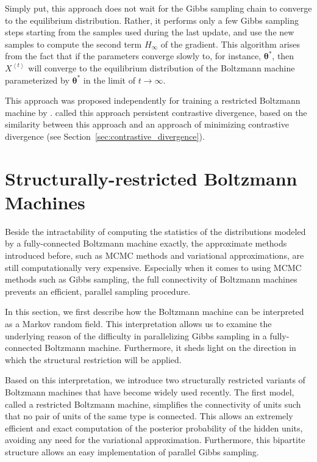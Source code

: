 \documentclass{now}
\newcommand{\qt}[1]{\left<#1\right>}
\newcommand{\vects}[1]{\boldsymbol{#1}}
\newcommand{\TT}[0]{{\vects{\theta}}}
\begin{document}
Simply put, this approach does not wait for the Gibbs sampling chain to converge
to the equilibrium distribution.  Rather, it performs only a few Gibbs sampling
steps starting from the samples used during the last update, and use the new
samples to compute the second term $H_\infty$ of the gradient. This algorithm
arises from the fact that if the parameters converge slowly to, for instance,
$\TT^*$, then $X^{\qt{t}}$ will converge to the equilibrium distribution of the
Boltzmann machine parameterized by $\TT^*$ in the limit of $t \to \infty$.

This approach was proposed independently for training a restricted Boltzmann
machine by \citet{Tieleman2008}.  \citet{Tieleman2008} called this approach
persistent contrastive divergence, based on the similarity between this approach
and an approach of minimizing contrastive divergence (see
Section~\ref{sec:contrastive_divergence}).




\section{Structurally-restricted Boltzmann Machines}
\label{sec:srbm}

Beside the intractability of computing the statistics of the distributions
modeled by a fully-connected Boltzmann machine exactly, the approximate methods
introduced before, such as MCMC methods and variational approximations, are
still computationally very expensive. Especially when it comes to using MCMC
methods such as Gibbs sampling, the full connectivity of Boltzmann machines
prevents an efficient, parallel sampling procedure.

In this section, we first describe how the Boltzmann machine can be interpreted
as a Markov random field. This interpretation allows us to examine the
underlying reason of the difficulty in parallelizing Gibbs sampling in a
fully-connected Boltzmann machine. Furthermore, it sheds light on the direction
in which the structural restriction will be applied.

Based on this interpretation, we introduce two structurally restricted variants
of Boltzmann machines that have become widely used recently. The first model,
called a restricted Boltzmann machine, simplifies the connectivity of units such
that no pair of units of the same type is connected. This allows an extremely
efficient and exact computation of the posterior probability of the hidden
units, avoiding any need for the variational approximation. Furthermore, this
bipartite structure allows an easy implementation of parallel Gibbs sampling.
\end{document}
